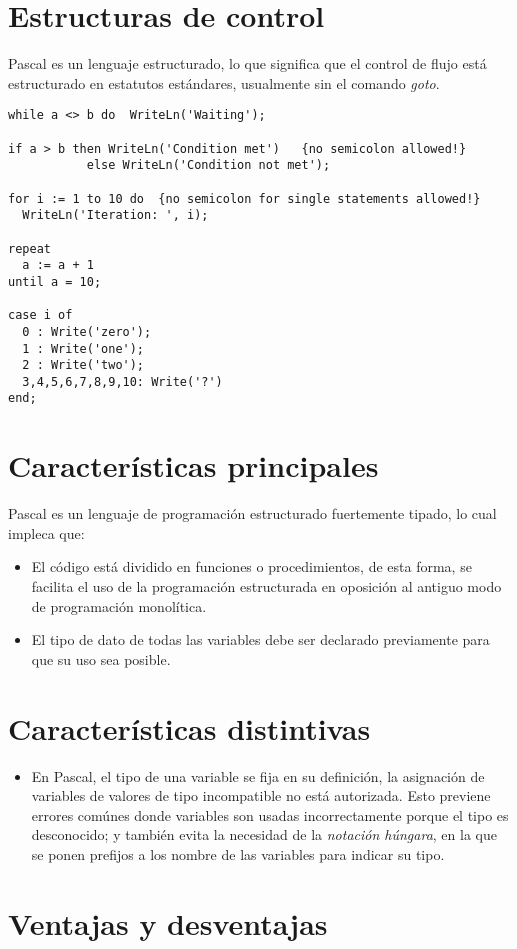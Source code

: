 \documentclass{IEEEtran}
\begin{document}
\section{Estructuras de control}
Pascal es un lenguaje estructurado, lo que significa que el control de flujo est\'a estructurado en estatutos est\'andares, usualmente sin el comando \emph{goto}.
\begin{lstlisting}
while a <> b do  WriteLn('Waiting');

if a > b then WriteLn('Condition met')   {no semicolon allowed!}
           else WriteLn('Condition not met');

for i := 1 to 10 do  {no semicolon for single statements allowed!}
  WriteLn('Iteration: ', i);

repeat
  a := a + 1
until a = 10;

case i of
  0 : Write('zero');
  1 : Write('one');
  2 : Write('two');
  3,4,5,6,7,8,9,10: Write('?')
end;
\end{lstlisting}
\section{Caracter\'isticas principales}
Pascal es un lenguaje de programaci\'on estructurado fuertemente tipado, lo cual impleca que:
\begin{itemize}
\item El c\'odigo est\'a dividido en funciones o procedimientos, de esta forma, se facilita el uso de la programaci\'on estructurada en oposici\'on al antiguo modo de programaci\'on monol\'itica.
\item El tipo de dato de todas las variables debe ser declarado previamente para que su uso sea posible.
\end{itemize}
\section{Caracter\'isticas distintivas}
\begin{itemize}
\item En Pascal, el tipo de una variable se fija en su definici\'on, la asignaci\'on de variables de valores de tipo incompatible no est\'a autorizada. Esto previene errores com\'unes donde variables son usadas incorrectamente porque el tipo es desconocido; y tambi\'en evita la necesidad de la \emph{notaci\'on h\'ungara}, en la que se ponen prefijos a los nombre de las variables para indicar su tipo.
\end{itemize}
\section{Ventajas y desventajas}
\end{document}
